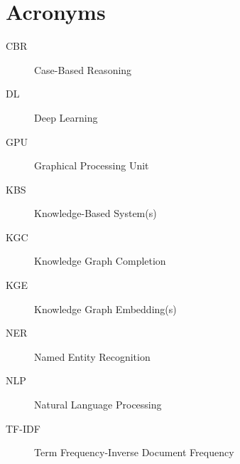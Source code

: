 

\chapter{Acronyms}
\begin{description}
\item[CBR]{Case-Based Reasoning}
\item[DL]{Deep Learning}
\item[GPU]{Graphical Processing Unit}
\item[KBS]{Knowledge-Based System(s)}
\item[KGC]{Knowledge Graph Completion}
\item[KGE]{Knowledge Graph Embedding(s)}
\item[NER]{Named Entity Recognition}
\item[NLP]{Natural Language Processing}
\item[TF-IDF]{Term Frequency-Inverse Document Frequency}

\end{description}




